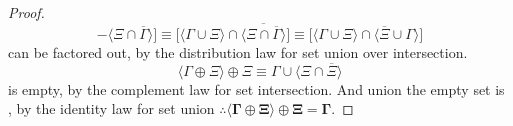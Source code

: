 \documentclass[preview]{standalone}
\begin{document}
\begin{proof}
\begin{equation*}
                -
            \Big \langle 
                \Xi
                    \cap 
                \overline{\Gamma} 
            \Big \rangle
        \bigg]
            \equiv
        \bigg[
            \Big \langle \Gamma \cup \Xi \Big \rangle
                \cap
            \Big \langle \overline{
                \Xi
                    \cap 
                \overline{\Gamma} 
            } \Big \rangle
        \bigg]
            \equiv
        \bigg[
            \Big \langle \Gamma \cup \Xi \Big \rangle
                \cap
            \Big \langle 
                \overline{\Xi}
                    \cup 
                \Gamma
            \Big \rangle
        \bigg]
    \end{equation*}
    \bm{$\Gamma$} can be factored out,
    by the distribution law for set union over intersection.
    \begin{equation*}
        \Big \langle \Gamma \oplus \Xi \Big \rangle
            \oplus 
        \Xi
            \equiv
        \Gamma 
            \cup
        \Big \langle \Xi \cap \overline{\Xi} \Big \rangle
    \end{equation*}
    \bm{$\Xi \cap \overline{\Xi}$} is empty, 
    by the complement law for set intersection. 
    And \bm{$\Gamma$} union the empty set is \bm{$\Gamma$},
    by the identity law for set union $\therefore \bm{
    \big \langle \Gamma \oplus \Xi \big \rangle
        \oplus 
    \Xi 
        = 
    \Gamma}$.
\color{lightgray} \end{proof}
\end{document}

